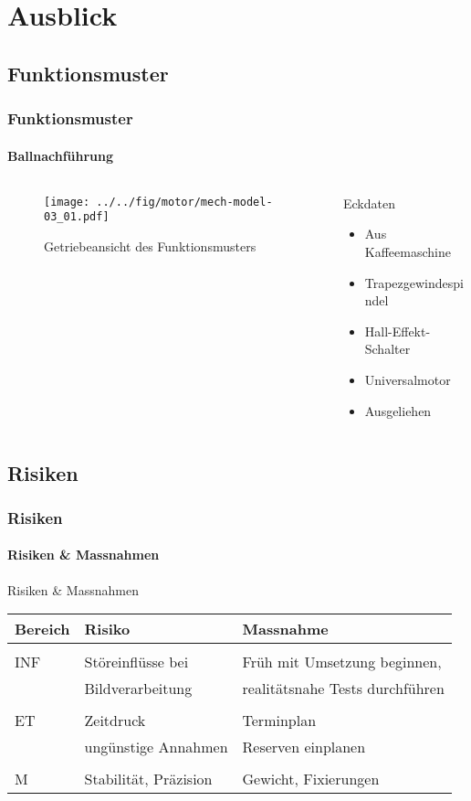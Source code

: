 \section{Ausblick}

\subsection{Funktionsmuster}
\begin{frame}
	\frametitle{Funktionsmuster\hfill{}\footnotesize \group}
	\framesubtitle{Ballnachführung}
	\begin{columns}
		\begin{column}{0.5\textwidth}
			\begin{figure}
				\texttt{[image: ../../fig/motor/mech-model-03\_01.pdf]}
				\caption{Getriebeansicht des Funktionsmusters}
			\end{figure}
		\end{column}
		\begin{column}{0.5\textwidth}
			\begin{block}{Eckdaten}
				\begin{itemize}
					\item Aus Kaffeemaschine
					\item Trapezgewindespindel
					\item Hall-Effekt-Schalter
					\item Universalmotor
					\item Ausgeliehen
				\end{itemize}
			\end{block}
		\end{column}
	\end{columns}
\end{frame}

\subsection{Risiken}
\begin{frame}
	\frametitle{Risiken \hfill{} \footnotesize \group}
	\framesubtitle{Risiken \& Massnahmen}
	\begin{block}{Risiken \& Massnahmen}
		\begin{tabular}{l l l}
			Bereich
				& Risiko
				& Massnahme \\
			\hline
			& & \\
			INF	& Störeinflüsse bei 
				& Früh mit 
				  Umsetzung beginnen, \\
				& Bildverarbeitung
				& realitätsnahe Tests
				 durchführen \\
			& & \\
			ET	& Zeitdruck
				& Terminplan \\
				& ungünstige Annahmen
				& Reserven einplanen \\
			& & \\
			M	& Stabilität, Präzision
				& Gewicht, Fixierungen \\
		\end{tabular}
	\end{block}
\end{frame}

